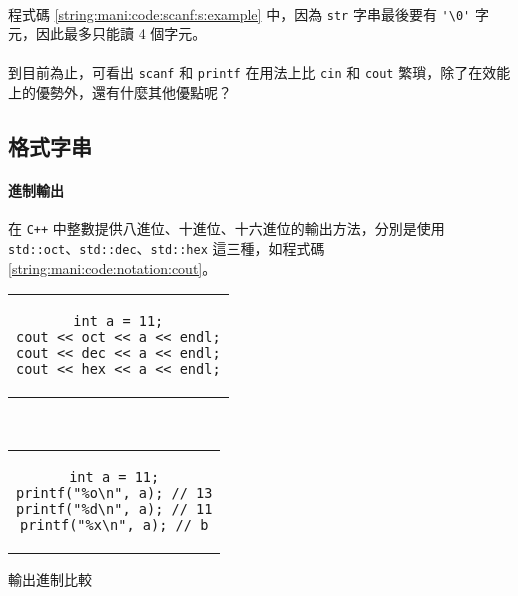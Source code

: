 \documentclass[12pt,a4paper,oneside]{report}
\begin{document}
\begin{CJK}{UTF8}{bkai}
\paragraph{}程式碼 \ref{string:mani:code:scanf:s:example} 中，因為 \lstinline!str! 字串最後要有 \lstinline!'\0'! 字元，因此最多只能讀 4 個字元。
\paragraph{}到目前為止，可看出 \lstinline!scanf! 和 \lstinline!printf! 在用法上比 \lstinline!cin! 和 \lstinline!cout! 繁瑣，除了在效能上的優勢外，還有什麼其他優點呢？

\subsection{格式字串}

\paragraph{進制輸出}在 \texttt{C++} 中整數提供八進位、十進位、十六進位的輸出方法，分別是使用 \lstinline!std::oct!、\lstinline!std::dec!、\lstinline!std::hex! 這三種，如程式碼 \ref{string:mani:code:notation:cout}。

\begin{code}[h!]
  \centering
  \begin{subcode}{.43\textwidth}
    \centering
    \begin{tabular}{c}
    \begin{lstlisting}
int a = 11;
cout << oct << a << endl;
cout << dec << a << endl;
cout << hex << a << endl;
    \end{lstlisting}
    \end{tabular}
    \caption{\lstinline!cout! 版本}
    \label{string:mani:code:notation:cout}
  \end{subcode}
  ~
  \begin{subcode}{.43\textwidth}
    \centering
    \begin{tabular}{c}
    \begin{lstlisting}
int a = 11;
printf("%o\n", a); // 13
printf("%d\n", a); // 11
printf("%x\n", a); // b
    \end{lstlisting}
    \end{tabular}
    \caption{\lstinline!printf! 版本}
    \label{string:mani:code:notation:printf}
  \end{subcode}
  \caption{輸出進制比較}
  \label{string:mani:code:notation}
\end{code}


\end{CJK}
\end{document}
